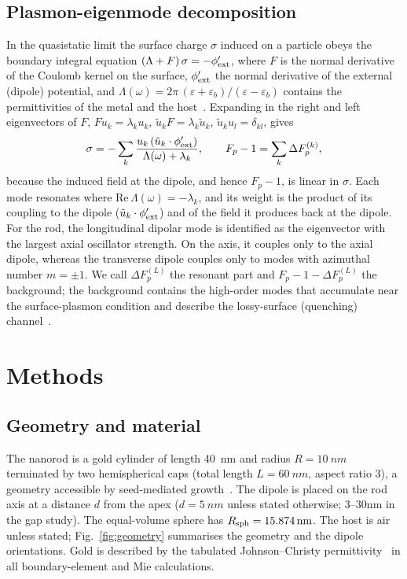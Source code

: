 \documentclass[11pt,a4paper]{article}
\newcommand{\Fp}{F_p}
\begin{document}
\subsection{Plasmon-eigenmode decomposition}
In the quasistatic limit the surface charge $\sigma$ induced on a particle obeys the boundary integral equation
$(\Lambda + F)\,\sigma = -\phi'_{\rm ext}$, where $F$ is the normal derivative of the Coulomb kernel on the surface,
$\phi'_{\rm ext}$ the normal derivative of the external (dipole) potential, and
$\Lambda(\omega)=2\pi\,(\varepsilon+\varepsilon_b)/(\varepsilon-\varepsilon_b)$ contains the permittivities of
the metal and the host~\cite{mayergoyz2005,hohenester2012}. Expanding in the right and left eigenvectors of $F$,
$F u_k=\lambda_k u_k$, $\tilde u_k F=\lambda_k\tilde u_k$, $\tilde u_k u_l=\delta_{kl}$, gives
\begin{equation}
  \sigma = -\sum_k \frac{u_k\,(\tilde u_k\cdot\phi'_{\rm ext})}{\Lambda(\omega)+\lambda_k},
  \qquad
  \Fp-1 = \sum_k \Delta\Fp^{(k)},
  \label{eq:modes}
\end{equation}
because the induced field at the dipole, and hence $\Fp-1$, is linear in $\sigma$. Each mode resonates where
$\mathrm{Re}\,\Lambda(\omega)=-\lambda_k$, and its weight is the product of its coupling to the dipole
($\tilde u_k\cdot\phi'_{\rm ext}$) and of the field it produces back at the dipole. For the rod, the longitudinal
dipolar mode is identified as the eigenvector with the largest axial oscillator strength. On the axis, it couples
only to the axial dipole, whereas the transverse dipole couples only to modes with azimuthal number $m=\pm1$. We
call $\Delta\Fp^{(L)}$ the resonant part and $\Fp-1-\Delta\Fp^{(L)}$ the background; the background contains the
high-order modes that accumulate near the surface-plasmon condition and describe the lossy-surface (quenching)
channel~\cite{ford,anger}.

\section{Methods}

\subsection{Geometry and material}
The nanorod is a gold cylinder of length \SI{40}{nm} and radius $R=\SI{10}{nm}$ terminated by two hemispherical
caps (total length $L=\SI{60}{nm}$, aspect ratio 3), a geometry accessible by seed-mediated
growth~\cite{nikoobakht}. The dipole is placed on the rod axis at a distance $d$ from the apex
($d=\SI{5}{nm}$ unless stated otherwise; \numrange{3}{30}{nm} in the gap study). The equal-volume sphere has
$R_{\rm sph}=\SI{15.874}{nm}$. The host is air unless stated; Fig.~\ref{fig:geometry} summarises the geometry and the dipole orientations. Gold is described by the tabulated
Johnson--Christy permittivity~\cite{johnson} in all boundary-element and Mie calculations.
\end{document}
